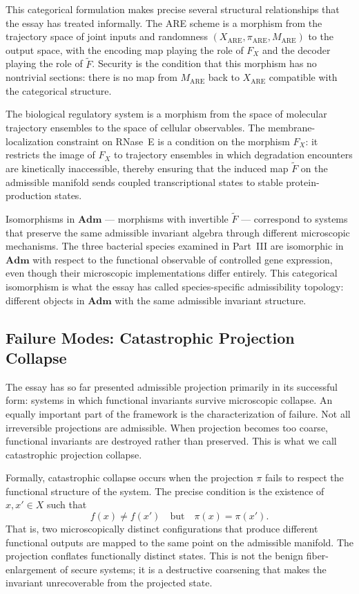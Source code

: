 \documentclass[12pt, a4paper]{article}
\theoremstyle{essaystyle}
\begin{document}
This categorical formulation makes precise several structural relationships that
the essay has treated informally. The ARE scheme is a morphism from the trajectory
space of joint inputs and randomness $(X_{\mathrm{ARE}}, \pi_{\mathrm{ARE}},
M_{\mathrm{ARE}})$ to the output space, with the encoding map playing the role of
$F_X$ and the decoder playing the role of $\tilde{F}$. Security is the condition
that this morphism has no nontrivial sections: there is no map from $M_{\mathrm{ARE}}$
back to $X_{\mathrm{ARE}}$ compatible with the categorical structure.

The biological regulatory system is a morphism from the space of molecular trajectory
ensembles to the space of cellular observables. The membrane-localization constraint
on RNase~E is a condition on the morphism $F_X$: it restricts the image of $F_X$ to
trajectory ensembles in which degradation encounters are kinetically inaccessible,
thereby ensuring that the induced map $\tilde{F}$ on the admissible manifold sends
coupled transcriptional states to stable protein-production states.

Isomorphisms in $\mathbf{Adm}$ --- morphisms with invertible $\tilde{F}$ --- correspond
to systems that preserve the same admissible invariant algebra through different
microscopic mechanisms. The three bacterial species examined in Part~III are
isomorphic in $\mathbf{Adm}$ with respect to the functional observable of controlled
gene expression, even though their microscopic implementations differ entirely.
This categorical isomorphism is what the essay has called species-specific admissibility
topology: different objects in $\mathbf{Adm}$ with the same admissible invariant structure.

\subsection{Failure Modes: Catastrophic Projection Collapse}

The essay has so far presented admissible projection primarily in its successful form:
systems in which functional invariants survive microscopic collapse. An equally
important part of the framework is the characterization of failure. Not all irreversible
projections are admissible. When projection becomes too coarse, functional invariants
are destroyed rather than preserved. This is what we call catastrophic projection
collapse.

Formally, catastrophic collapse occurs when the projection $\pi$ fails to respect the
functional structure of the system. The precise condition is the existence of
$x, x' \in X$ such that
\[
f(x) \neq f(x') \quad \text{but} \quad \pi(x) = \pi(x').
\]
That is, two microscopically distinct configurations that produce different functional
outputs are mapped to the same point on the admissible manifold. The projection
conflates functionally distinct states. This is not the benign fiber-enlargement
of secure systems; it is a destructive coarsening that makes the invariant
unrecoverable from the projected state.
\end{document}
